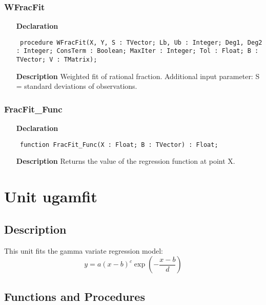 \documentclass[12pt,a4paper,oneside]{report}
\newcommand{\declarationitem}[1]{\textbf{#1}}
\newcommand{\descriptiontitle}[1]{\textbf{#1}}
\newcommand{\code}[1]{\texttt{#1}}
\begin{document}
\subsubsection{WFracFit}
\label{ufracfit-WFracFit}
\begin{itemize}\item[\declarationitem{Declaration}\hfill]
	\begin{flushleft}
		\code{
			procedure WFracFit(X, Y, S : TVector; Lb, Ub : Integer; Deg1, Deg2 : Integer; ConsTerm : Boolean; MaxIter : Integer; Tol : Float; B : TVector; V : TMatrix);}
		
	\end{flushleft}
	
	\par
	\item[\descriptiontitle{Description}]
	Weighted fit of rational fraction. Additional input parameter: S = standard deviations of observations.
	
\end{itemize}
\subsubsection{FracFit{\_}Func}
\label{ufracfit-FracFit_Func}
\begin{itemize}\item[\declarationitem{Declaration}\hfill]
	\begin{flushleft}
		\code{
			function FracFit{\_}Func(X : Float; B : TVector) : Float;}
		
	\end{flushleft}
	
	\par
	\item[\descriptiontitle{Description}]
	Returns the value of the regression function at point X.
	
\end{itemize}
\section{Unit ugamfit}
\label{ugamfit}
\subsection{Description}
This unit fits the gamma variate regression model:
$$y = a (x - b)^c \exp\left(-\frac{x - b}{d}\right)$$
\subsection{Functions and Procedures}
\end{document}
